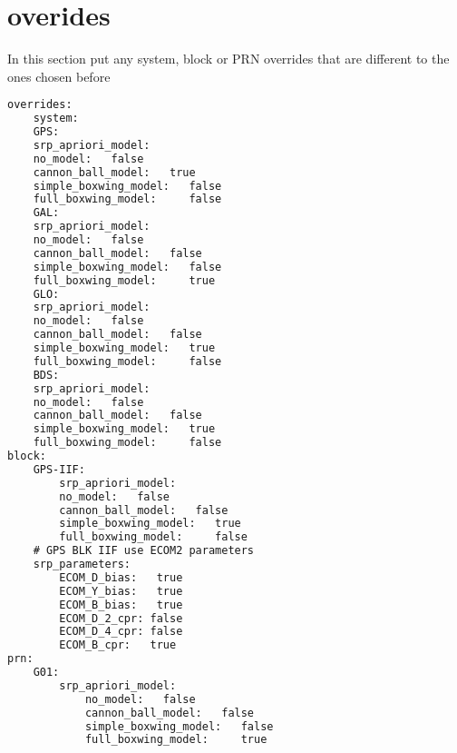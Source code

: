 \section{overides}
In this section put any system, block or PRN overrides that are different to the ones chosen before
{\small
	\begin{lstlisting}[language=xml,caption=yaml example for override]
overrides:
	system:
	GPS:
	srp_apriori_model:
	no_model:   false
	cannon_ball_model:   true
	simple_boxwing_model:   false
	full_boxwing_model:     false
	GAL:
	srp_apriori_model:
	no_model:   false
	cannon_ball_model:   false
	simple_boxwing_model:   false
	full_boxwing_model:     true
	GLO:
	srp_apriori_model:
	no_model:   false
	cannon_ball_model:   false
	simple_boxwing_model:   true
	full_boxwing_model:     false
	BDS:
	srp_apriori_model:
	no_model:   false
	cannon_ball_model:   false
	simple_boxwing_model:   true
	full_boxwing_model:     false
block:
	GPS-IIF:
		srp_apriori_model:
		no_model:   false
		cannon_ball_model:   false
		simple_boxwing_model:   true
		full_boxwing_model:     false
	# GPS BLK IIF use ECOM2 parameters
	srp_parameters:
		ECOM_D_bias:   true
		ECOM_Y_bias:   true
		ECOM_B_bias:   true
		ECOM_D_2_cpr: false
		ECOM_D_4_cpr: false
		ECOM_B_cpr:   true
prn:
	G01:
		srp_apriori_model:
			no_model:   false
			cannon_ball_model:   false
			simple_boxwing_model:   false
			full_boxwing_model:     true
	

	\end{lstlisting}
}

%
%
%
%
%